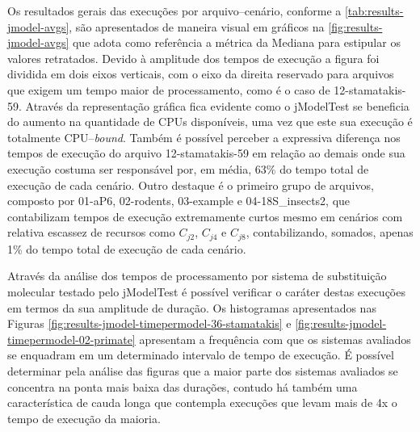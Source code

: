 \documentclass[english,brazilian]{UNISINOSmonografia} %
\begin{document}
{\begin{figure}[bt]
\begin{minipage}{.52\textwidth}
	\end{minipage}
\end{figure}
}



Os resultados gerais das execuções por arquivo--cenário, conforme a \autoref{tab:results-jmodel-avgs}, são apresentados de maneira visual em gráficos na \autoref{fig:results-jmodel-avgs} que adota como referência a métrica da Mediana para estipular os valores retratados.
%
Devido à amplitude dos tempos de execução a figura foi dividida em dois eixos verticais, com o eixo da direita reservado para arquivos que exigem um tempo maior de processamento, como é o caso de 12-stamatakis-59.
%
Através da representação gráfica fica evidente como o jModelTest se beneficia do aumento na quantidade de CPUs disponíveis, uma vez que este sua execução é totalmente CPU--\textit{bound}.
%
Também é possível perceber a expressiva diferença nos tempos de execução do arquivo 12-stamatakis-59 em relação ao demais onde sua execução costuma ser responsável por, em média, 63\% do tempo total de execução de cada cenário.
%
Outro destaque é o primeiro grupo de arquivos, composto por 01-aP6, 02-rodents, 03-example e 04-18S\_insects2, que contabilizam tempos de execução extremamente curtos mesmo em cenários com relativa escassez de recursos como $C_{j2}$, $C_{j4}$ e $C_{j8}$, contabilizando, somados, apenas 1\% do tempo total de execução de cada cenário.


Através da análise dos tempos de processamento por sistema de substituição molecular testado pelo jModelTest é possível verificar o caráter destas execuções em termos da sua amplitude de duração.
%
Os histogramas apresentados nas Figuras \ref{fig:results-jmodel-timepermodel-36-stamatakis} e \ref{fig:results-jmodel-timepermodel-02-primate} apresentam a frequência com que os sistemas avaliados se enquadram em um determinado intervalo de tempo de execução.
%
É possível determinar pela análise das figuras que a maior parte dos sistemas avaliados se concentra na ponta mais baixa das durações, contudo há também uma característica de cauda longa que contempla execuções que levam mais de 4x o tempo de execução da maioria.
\end{document}
